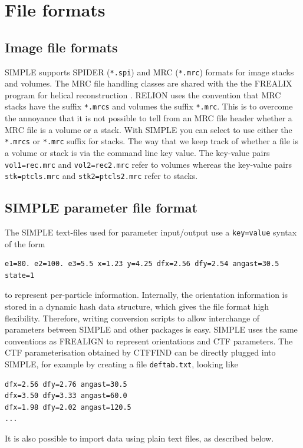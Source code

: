 \documentclass[a4paper,11pt]{article}
\begin{document}
\section{File formats}

\subsection{Image file formats}
SIMPLE supports SPIDER (\texttt{*.spi}) and MRC (\texttt{*.mrc}) formats for image stacks and volumes. The MRC file handling classes are shared with the the FREALIX program for helical reconstruction \citep{Rohou:2014aa}. RELION \citep{Scheres:2012aa} uses the convention that MRC stacks have the suffix \texttt{*.mrcs} and volumes the suffix \texttt{*.mrc}. This is to overcome the annoyance that it is not possible to tell from an MRC file header whether a MRC file is a volume or a stack. With SIMPLE you can select to use either the \texttt{*.mrcs} or \texttt{*.mrc} suffix for stacks. The way that we keep track of whether a file is a volume or stack is via the command line key value. The key-value pairs \texttt{vol1=rec.mrc} and \texttt{vol2=rec2.mrc} refer to volumes whereas the key-value pairs \texttt{stk=ptcls.mrc} and \texttt{stk2=ptcls2.mrc} refer to stacks.

\subsection{SIMPLE parameter file format}
The SIMPLE text-files used for parameter input/output use a \texttt{key=value} syntax of the form
\begin{Verbatim}[commandchars=+\[\],fontsize=\small,breaklines=true]
e1=80. e2=100. e3=5.5 x=1.23 y=4.25 dfx=2.56 dfy=2.54 angast=30.5 state=1
\end{Verbatim}
to represent per-particle information. Internally, the orientation information is stored in a dynamic hash data structure, which gives the file format high flexibility. Therefore, writing conversion scripts to allow interchange of parameters between SIMPLE and other packages is easy. SIMPLE uses the same conventions as FREALIGN \citep{Grigorieff:2007aa} to represent orientations and CTF parameters. The CTF parameterisation obtained by CTFFIND \citep{Mindell:2003aa} can be directly plugged into SIMPLE, for example by creating a file \texttt{deftab.txt}, looking like
\begin{Verbatim}[commandchars=+\[\],fontsize=\small,breaklines=true]
dfx=2.56 dfy=2.76 angast=30.5
dfx=3.50 dfy=3.33 angast=60.0
dfx=1.98 dfy=2.02 angast=120.5
...
\end{Verbatim}
It is also possible to import data using plain text files, as described below.
\end{document}
